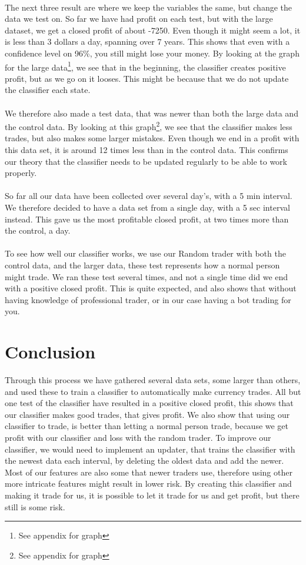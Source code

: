 \documentclass[10pt]{IEEEtran}
\begin{document}
\\
The next three result are where we keep the variables the same, but change the data we test on. So far we have had profit on each test, but with the large dataset, we get a closed profit of about -7250. Even though it might seem a lot, it is less than 3 dollars a day, spanning over 7 years. This shows that even with a confidence level on 96\%, you still might lose your money. By looking at the graph for the large data\footnote{See appendix for graph}, we see that in the beginning, the classifier creates positive profit, but as we go on it looses. This might be because that we do not update the classifier each state.\\
\\
We therefore also made a test data, that was newer than both the large data and the control data. By looking at this graph\footnote{See appendix for graph}, we see that the classifier makes less trades, but also makes some larger mistakes. Even though we end in a profit with this data set, it is around 12 times less than in the control data. This confirms our theory that the classifier needs to be updated regularly to be able to work properly.
\\
\\
So far all our data have been collected over several day's, with a 5 min interval. We therefore decided to have a data set from a single day, with a 5 sec interval instead. This gave us the most profitable closed profit, at two times more than the control, a day.\\
\\
To see how well our classifier works, we use our Random trader with both the control data, and the larger data, these test represents how a normal person might trade. We ran these test several times, and not a single time did we end with a positive closed profit. This is quite expected, and also shows that without having knowledge of professional trader, or in our case having a bot trading for you.

\section{Conclusion}
Through this process we have gathered several data sets, some larger than others, and used these to train a classifier to automatically make currency trades. All but one test of the classifier have resulted in a positive closed profit, this shows that our classifier makes good trades, that gives profit. We also show that using our classifier to trade, is better than letting a normal person trade, because we get profit with our classifier and loss with the random trader. To improve our classifier, we would need to implement an updater, that trains the classifier with the newest data each interval, by deleting the oldest data and add the newer. Most of our features are also some that newer traders use, therefore using other more intricate features might result in lower risk. By creating this classifier and making it trade for us, it is possible to let it trade for us and get profit, but there still is some risk.
\end{document}

